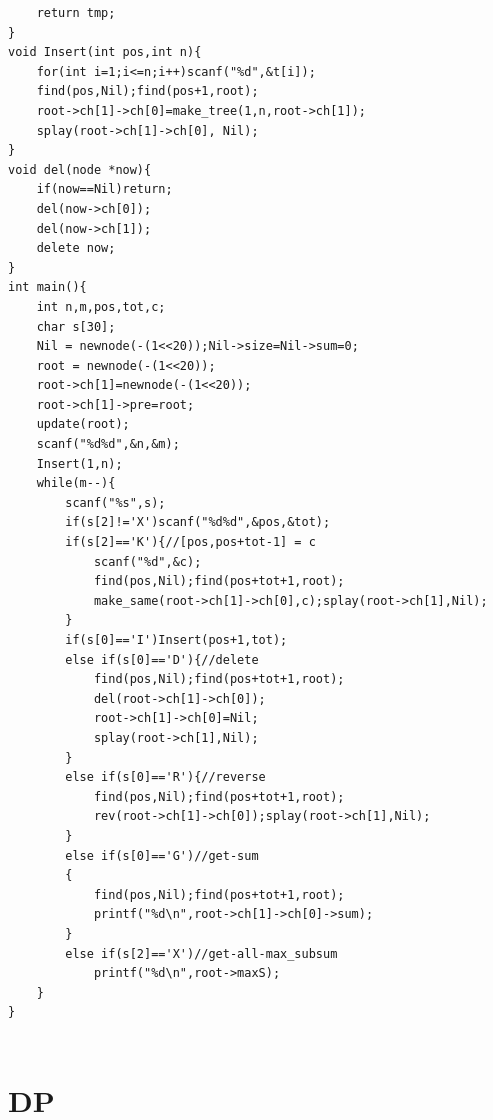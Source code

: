 \documentclass[10pt,twocolumn,oneside]{article}
\begin{document}
\begin{lstlisting}
	return tmp;
}
void Insert(int pos,int n){
	for(int i=1;i<=n;i++)scanf("%d",&t[i]);
	find(pos,Nil);find(pos+1,root);
	root->ch[1]->ch[0]=make_tree(1,n,root->ch[1]);
	splay(root->ch[1]->ch[0], Nil);
}
void del(node *now){
	if(now==Nil)return;
	del(now->ch[0]);
	del(now->ch[1]);
	delete now;
}
int main(){
	int n,m,pos,tot,c;
	char s[30];
	Nil = newnode(-(1<<20));Nil->size=Nil->sum=0;
	root = newnode(-(1<<20));
	root->ch[1]=newnode(-(1<<20));
	root->ch[1]->pre=root;
	update(root);
	scanf("%d%d",&n,&m);
	Insert(1,n);
	while(m--){
		scanf("%s",s);
		if(s[2]!='X')scanf("%d%d",&pos,&tot);
		if(s[2]=='K'){//[pos,pos+tot-1] = c
			scanf("%d",&c);
			find(pos,Nil);find(pos+tot+1,root);
			make_same(root->ch[1]->ch[0],c);splay(root->ch[1],Nil);
		}
		if(s[0]=='I')Insert(pos+1,tot);
		else if(s[0]=='D'){//delete
			find(pos,Nil);find(pos+tot+1,root);
			del(root->ch[1]->ch[0]);
			root->ch[1]->ch[0]=Nil;
			splay(root->ch[1],Nil);
		}
		else if(s[0]=='R'){//reverse
			find(pos,Nil);find(pos+tot+1,root);
			rev(root->ch[1]->ch[0]);splay(root->ch[1],Nil);
		}
		else if(s[0]=='G')//get-sum
		{
			find(pos,Nil);find(pos+tot+1,root);
			printf("%d\n",root->ch[1]->ch[0]->sum);
		}
		else if(s[2]=='X')//get-all-max_subsum
			printf("%d\n",root->maxS);
	}
}


\end{lstlisting}
\section{DP}
\end{document}
